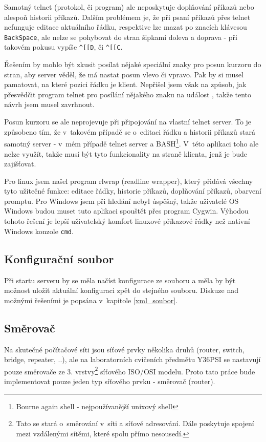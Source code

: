 Samotný telnet (protokol, či program) ale neposkytuje doplňování příkazů nebo alespoň historii příkazů. Dalším problémem je, že při psaní příkazů přes telnet nefunguje editace aktuálního řádku, respektive lze mazat po znacích klávesou \verb|BackSpace|, ale nelze se pohybovat do stran šipkami doleva a doprava - při takovém pokusu vypíše \verb|^[[D|, či \verb|^[[C|. 

Řešením by mohlo být zkusit posílat nějaké speciální znaky pro posun kurzoru do stran, aby server věděl, že má nastat posun vlevo či vpravo. Pak by si musel pamatovat, na které pozici řádku je klient. Nepřišel jsem však na způsob, jak přesvědčit program telnet pro posílání nějakého znaku na událost , takže tento návrh jsem musel zavrhnout.

Posun kurzoru se ale neprojevuje při připojování na vlastní telnet server. To je způsobeno tím, že v~takovém případě se o~editaci řádku a historii příkazů stará samotný server - v~mém případě telnet server a BASH\footnote{Bourne again shell - nejpoužívanější unixový shell}. V~této aplikaci toho ale nelze využít, takže musí být tyto funkcionality na straně klienta, jenž je bude zajišťovat. 

Pro linux jsem našel program rlwrap (readline wrapper), který přidává všechny tyto užitečné funkce: editace řádky, historie příkazů, doplňování příkazů, obarvení promptu. Pro Windows jsem při hledání nebyl úspěšný, takže uživatelé OS Windows budou muset tuto aplikaci spouštět přes program Cygwin. Výhodou tohoto řešení je lepší uživatelský komfort linuxové příkazové řádky než nativní Windows konzole \verb|cmd|.


\subsection{Konfigurační soubor}
Při startu serveru by se měla načíst konfigurace ze souboru a měla by být možnost uložit aktuální konfiguraci zpět do stejného souboru. Diskuze nad možnými řešeními je popsána v~kapitole \ref{xml_soubor}.


\subsection{Směrovač}
Na skutečné počítačové síti jsou síťové prvky několika druhů (router, switch, bridge, repeater, ..), ale na laboratorních cvičeních předmětu Y36PSI se  nastavují pouze směrovače ze 3. vrstvy\footnote{Tato  se stará o~směrování v~síti a síťové adresování. Dále poskytuje spojení mezi vzdálenými sítěmi, které spolu přímo nesousedí.} síťového ISO/OSI modelu. Proto tato práce bude implementovat pouze jeden typ síťového prvku - směrovač (router). 

